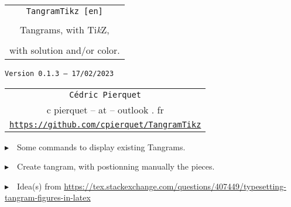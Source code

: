 \documentclass{article}
\def\TPversion{0.1.3}
\def\TPdate{17/02/2023}
\begin{document}
\pagestyle{fancy}

\thispagestyle{empty}

\vspace{2cm}

\begin{center}
	\begin{minipage}{0.75\linewidth}
	\begin{tcolorbox}[colframe=yellow,colback=yellow!15]
		\begin{center}
			\begin{tabular}{c}
				{\Huge \texttt{TangramTikz [en]}}\\
				\\
				{\LARGE Tangrams, with Ti\textit{k}Z}, \\
				\\
				{\LARGE with solution and/or color.} \\
			\end{tabular}
			
			\medskip
			
			{\small \texttt{Version \TPversion{} -- \TPdate}}
		\end{center}
	\end{tcolorbox}
\end{minipage}
\end{center}

\vspace{0.5cm}

\begin{center}
	\begin{tabular}{c}
	\texttt{Cédric Pierquet}\\
	{\ttfamily c pierquet -- at -- outlook . fr}\\
	\texttt{\url{https://github.com/cpierquet/TangramTikz}}
\end{tabular}
\end{center}

\vspace{0.5cm}

{$\blacktriangleright$~~Some commands to display existing Tangrams.}

\smallskip

{$\blacktriangleright$~~Create tangram, with postionning manually the pieces.}

\smallskip

{$\blacktriangleright$~~Idea(s) from \url{https://tex.stackexchange.com/questions/407449/typesetting-tangram-figures-in-latex}}

\vspace{1cm}
\end{document}
